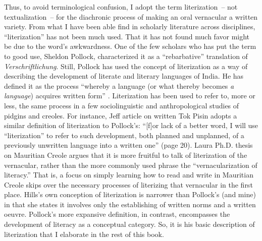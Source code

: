 Thus, to avoid terminological confusion, I adopt the term literization~-- not textualization~-- for the diachronic process of making an oral vernacular a written variety. From what I have been able find in scholarly literature across disciplines, “literization” has not been much used. That it has not found much favor might be due to the word’s awkwardness. One of the few scholars who has put the term to good use, Sheldon Pollock, characterized it as a “rebarbative” translation of \textit{Verschriftlichung}. Still, Pollock has used the concept of literization as a way of describing the development of literate and literary languages of India. He has defined it as the process “whereby a language (or what thereby becomes \textit{a language}) acquires written form” \citep[283--284]{Pollock2007}. Literization has been used to refer to, more or less, the same process in a few sociolinguistic and anthropological studies of pidgins and creoles. For instance, Jeff  article on written Tok Pisin adopts a similar definition of literization to Pollock’s: “[f]or lack of a better word, I will use “literization” to refer to such development, both planned and unplanned, of a previously unwritten language into a written one” (page 20). Laura  Ph.D. thesis on Mauritian Creole argues that it is more fruitful to talk of literization of the vernacular, rather than the more commonly used phrase the “vernacularization of literacy.” That is, a focus on simply learning how to read and write in Mauritian Creole skips over the necessary processes of literizing that vernacular in the first place. Hills’s own conception of literization is narrower than Pollock’s (and mine) in that she states it involves only the establishing of written norms and a written oeuvre. Pollock’s more expansive definition, in contrast, encompasses the development of literacy as a conceptual category. So, it is his basic description of literization that I elaborate in the rest of this book.

